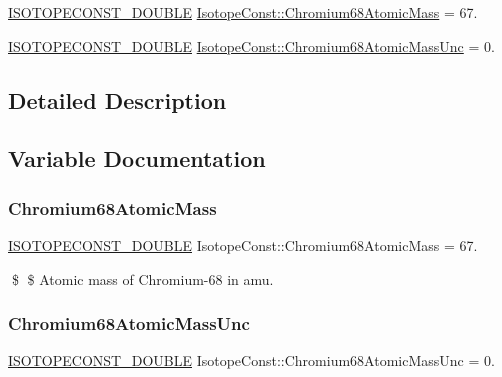 \begin{DoxyCompactItemize}
\item 
\mbox{\hyperlink{group___isotope_const-_macros_ga8f45a7272ce02c0b4c65c44636ed719a}{I\+S\+O\+T\+O\+P\+E\+C\+O\+N\+S\+T\+\_\+\+D\+O\+U\+B\+LE}} \mbox{\hyperlink{group___isotope_const-_chromium-_cr68_gaf9cc36884e2b62dbbd8d0469cda9d6fe}{Isotope\+Const\+::\+Chromium68\+Atomic\+Mass}} = 67.
\item 
\mbox{\hyperlink{group___isotope_const-_macros_ga8f45a7272ce02c0b4c65c44636ed719a}{I\+S\+O\+T\+O\+P\+E\+C\+O\+N\+S\+T\+\_\+\+D\+O\+U\+B\+LE}} \mbox{\hyperlink{group___isotope_const-_chromium-_cr68_ga1733ba577771c0dd4401d08dcfc4c1b1}{Isotope\+Const\+::\+Chromium68\+Atomic\+Mass\+Unc}} = 0.
\end{DoxyCompactItemize}


\subsection{Detailed Description}


\subsection{Variable Documentation}
\mbox{\label{group___isotope_const-_chromium-_cr68_gaf9cc36884e2b62dbbd8d0469cda9d6fe}} 
\subsubsection{\texorpdfstring{Chromium68\+Atomic\+Mass}{Chromium68AtomicMass}}
{\footnotesize\ttfamily \mbox{\hyperlink{group___isotope_const-_macros_ga8f45a7272ce02c0b4c65c44636ed719a}{I\+S\+O\+T\+O\+P\+E\+C\+O\+N\+S\+T\+\_\+\+D\+O\+U\+B\+LE}} Isotope\+Const\+::\+Chromium68\+Atomic\+Mass = 67.}

\$ \$ Atomic mass of Chromium-\/68 in amu. \mbox{\label{group___isotope_const-_chromium-_cr68_ga1733ba577771c0dd4401d08dcfc4c1b1}} 
\subsubsection{\texorpdfstring{Chromium68\+Atomic\+Mass\+Unc}{Chromium68AtomicMassUnc}}
{\footnotesize\ttfamily \mbox{\hyperlink{group___isotope_const-_macros_ga8f45a7272ce02c0b4c65c44636ed719a}{I\+S\+O\+T\+O\+P\+E\+C\+O\+N\+S\+T\+\_\+\+D\+O\+U\+B\+LE}} Isotope\+Const\+::\+Chromium68\+Atomic\+Mass\+Unc = 0.}

